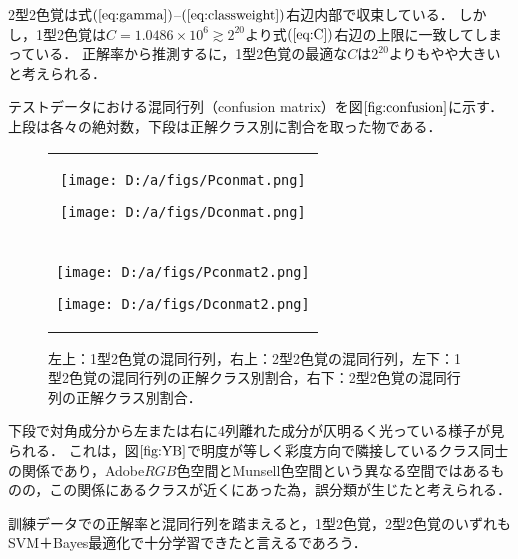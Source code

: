 \documentclass[uplatex,paper=a4,fontsize=4.0truemm,jafontsize=4.0truemm,head_space=30.0truemm,foot_space=30.0truemm,baselineskip=8.0truemm,line_length=40zw,gutter=25.0truemm,oneside,openany,fleqn,hanging_panctuation,open_bracket_pos=nibu_tentsuki,dvipdfmx,jis2004,book,titlepage]{jlreq}
\theoremstyle{mystyle}
\newcommand{\captiondot}[1]{\caption{#1．}}
\newcommand{\mathdisplaystyle}[1]{\(\displaystyle{#1}\)}
\newcommand{\Reference}[1]{\mathdisplaystyle{\ref{#1}}}
\newcommand{\Equationreference}[1]{\mathdisplaystyle{\parentheses{\ref{#1}}}}
\newcommand{\parentheses}[1]{\left(#1\right)}
\begin{document}
				2型2色覚は式\Equationreference{eq:gamma}--\Equationreference{eq:classweight}右辺内部で収束している．
				しかし，1型2色覚は\mathdisplaystyle{C=1.0486\times10^6\gtrsim2^{20}}より式\Equationreference{eq:C}右辺の上限に一致してしまっている．
				正解率から推測するに，1型2色覚の最適な\mathdisplaystyle{C}は\mathdisplaystyle{2^{20}}よりもやや大きいと考えられる．

				テストデータにおける混同行列（confusion matrix）を図\Reference{fig:confusion}に示す．
				上段は各々の絶対数，下段は正解クラス別に割合を取った物である．
				\begin{figure}[tbp]
					\centering
					\begin{tabular}{c}
						\begin{minipage}{0.5\linewidth}
							\centering
							\texttt{[image: D:/a/figs/Pconmat.png]}
						\end{minipage}
						\begin{minipage}{0.5\linewidth}
							\centering
							\texttt{[image: D:/a/figs/Dconmat.png]}
						\end{minipage} \\
						\begin{minipage}{0.06\linewidth}
							\vspace{10truemm}
						\end{minipage} \\
						\begin{minipage}{0.5\linewidth}
							\centering
							\texttt{[image: D:/a/figs/Pconmat2.png]}
						\end{minipage}
						\begin{minipage}{0.5\linewidth}
							\centering
							\texttt{[image: D:/a/figs/Dconmat2.png]}
						\end{minipage}
					\end{tabular}
					\captiondot{左上：1型2色覚の混同行列，右上：2型2色覚の混同行列，左下：1型2色覚の混同行列の正解クラス別割合，右下：2型2色覚の混同行列の正解クラス別割合}\label{fig:confusion}
				\end{figure}
				下段で対角成分から左または右に4列離れた成分が仄明るく光っている様子が見られる．
				これは，図\Reference{fig:YB}で明度が等しく彩度方向で隣接しているクラス同士の関係であり，Adobe\mathdisplaystyle{RGB}色空間とMunsell色空間という異なる空間ではあるものの，この関係にあるクラスが近くにあった為，誤分類が生じたと考えられる．

				訓練データでの正解率と混同行列を踏まえると，1型2色覚，2型2色覚のいずれもSVM＋Bayes最適化で十分学習できたと言えるであろう．
\end{document}
